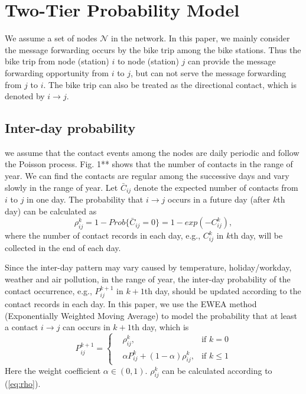 \section{Two-Tier Probability Model}
\label{sec:sysmodel}
We assume a set of nodes $\mathcal{N}$ in the network.
In this paper, we mainly consider the message forwarding occurs by the bike trip among the bike stations.
Thus the bike trip from node (station) $i$ to node (station) $j$
can provide the message forwarding opportunity from $i$ to $j$,
but can not serve the message forwarding from $j$ to $i$.
The bike trip can also be treated as the directional contact,
which is denoted by $i \rightarrow j$.

\subsection{Inter-day probability}
we assume that the contact events among the nodes are daily periodic
and follow the Poisson process.
Fig. 1** shows that the number of contacts in the range of year.
We can find the contacts are regular among the successive days
and vary slowly in the range of year.
Let $\bar{C}_{i j}$ denote the expected number of contacts from $i$ to $j$ in one day.
The probability that $i \rightarrow j$ occurs in a future day (after $k$th day) can be calculated as
\begin{equation}
\label{eq:rho}
\rho^{k}_{i j} = 1 - Prob\{\bar{C}_{i j}=0\} = 1 - exp(-C^{k}_{i j}),
\end{equation}
where the number of contact records in each day, e.g., $C^{k}_{i j}$ in $k$th day,
will be collected in the end of each day.

Since the inter-day pattern may vary caused by
temperature, holiday/workday, weather and air pollution, in the range of year,
the inter-day probability of the contact occurrence, e.g., $P^{k+1}_{i j}$ in $k+1$th day,
should be updated according to the contact records in each day.
In this paper, we use the EWEA method (Exponentially Weighted Moving Average) to
model the probability that at least a contact $i \rightarrow j$ can occurs in $k+1$th day,
which is
\begin{equation}
P^{k+1}_{i j} =
\left\{
\begin{aligned}
& \rho^{k}_{i j}, &\text{if  } k = 0 \\
& \alpha P^{k}_{i j} + (1-\alpha) \rho^{k}_{i j}, &\text{if  } k \le 1
\end{aligned}
\right.
\end{equation}
Here the weight coefficient $\alpha \in (0, 1)$.
$\rho^{k}_{i j}$ can be calculated according to (\ref{eq:rho}).


